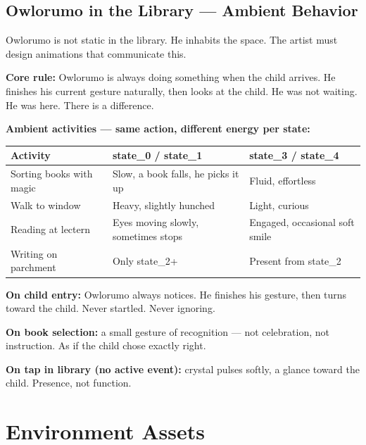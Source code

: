 \documentclass[11pt, a4paper]{article}
\begin{document}
\subsection{Owlorumo in the Library — Ambient Behavior}

Owlorumo is not static in the library. He inhabits the space.
The artist must design animations that communicate this.

\begin{notebox}
  \textbf{Core rule:} Owlorumo is always doing something when the child arrives.
  He finishes his current gesture naturally, then looks at the child.
  He was not waiting. He was here. There is a difference.
\end{notebox}

\textbf{Ambient activities — same action, different energy per state:}

\begin{tabularx}{\textwidth}{@{}l >{\raggedright\arraybackslash}X >{\raggedright\arraybackslash}X@{}}
  \toprule
  \rowcolor{tabhead}
  \color{white}\sffamily\bfseries Activity &
  \color{white}\sffamily\bfseries state\_0 / state\_1 &
  \color{white}\sffamily\bfseries state\_3 / state\_4 \\
  \midrule
  \rowcolor{tabrow}Sorting books with magic & Slow, a book falls, he picks it up & Fluid, effortless \\
  Walk to window & Heavy, slightly hunched & Light, curious \\
  \rowcolor{tabrow}Reading at lectern & Eyes moving slowly, sometimes stops & Engaged, occasional soft smile \\
  Writing on parchment & Only state\_2+ & Present from state\_2 \\
  \bottomrule
\end{tabularx}

\vspace{6pt}
\textbf{On child entry:} Owlorumo always notices. He finishes his gesture,
then turns toward the child. Never startled. Never ignoring.

\textbf{On book selection:} a small gesture of recognition —
not celebration, not instruction. As if the child chose exactly right.

\textbf{On tap in library (no active event):} crystal pulses softly,
a glance toward the child. Presence, not function.

\section{Environment Assets}
\end{document}
